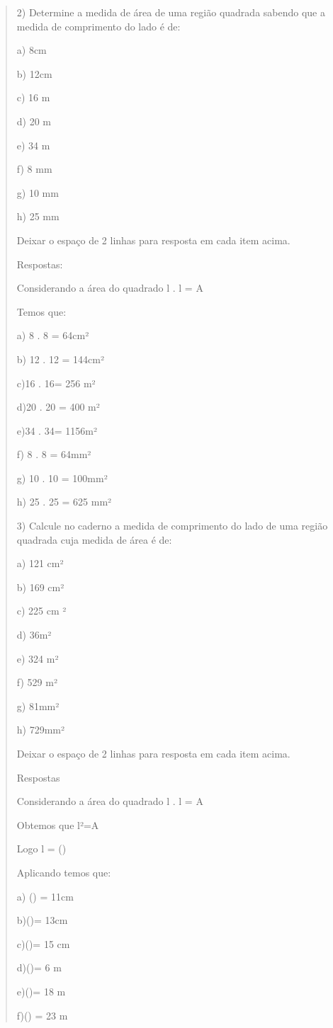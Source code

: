 \begin{quote}
\begin{escolha}
2) Determine a medida de área de uma região quadrada sabendo que a
medida de comprimento do lado é de:

a) 8cm

b) 12cm

c) 16 m

d) 20 m

e) 34 m

f) 8 mm

g) 10 mm

h) 25 mm

Deixar o espaço de 2 linhas para resposta em cada item acima.

Respostas:

Considerando a área do quadrado l . l = A

Temos que:

a) 8 . 8 = 64cm²

b) 12 . 12 = 144cm²

c)16 . 16= 256 m²

d)20 . 20 = 400 m²

e)34 . 34= 1156m²

f) 8 . 8 = 64mm²

g) 10 . 10 = 100mm²

h) 25 . 25 = 625 mm²

3) Calcule no caderno a medida de comprimento do lado de uma região
quadrada cuja medida de área é de:

a) 121 cm²

b) 169 cm²

c) 225 cm ²

d) 36m²

e) 324 m²

f) 529 m²

g) 81mm²

h) 729mm²

Deixar o espaço de 2 linhas para resposta em cada item acima.

Respostas

Considerando a área do quadrado l . l = A

Obtemos que l²=A

Logo l = ()

Aplicando temos que:

a) () = 11cm

b)()= 13cm

c)()= 15 cm

d)()= 6 m

e)()= 18 m

f)() = 23 m


\end{escolha}
\end{quote}
